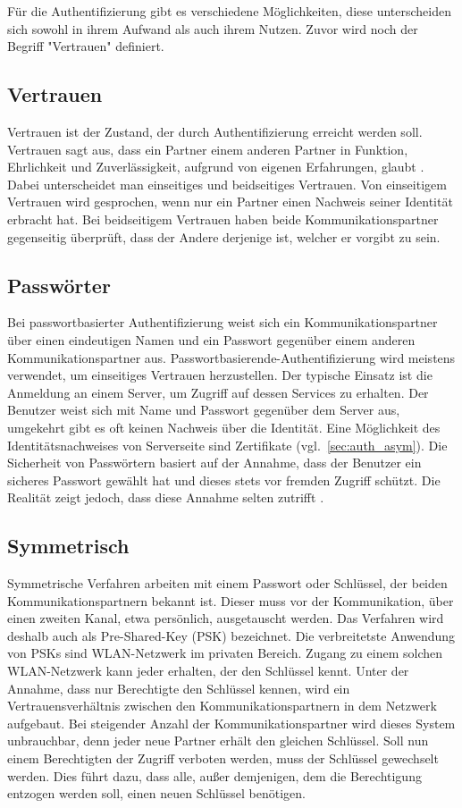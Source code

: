 \documentclass[11pt,a4paper]{report}
\begin{document}
Für die Authentifizierung gibt es verschiedene Möglichkeiten, diese unterscheiden sich sowohl in ihrem Aufwand als auch ihrem Nutzen. Zuvor wird noch der Begriff "Vertrauen" definiert.

\subsection{Vertrauen}

Vertrauen ist der Zustand, der durch Authentifizierung erreicht werden soll. Vertrauen sagt aus, dass ein Partner einem anderen Partner in Funktion, Ehrlichkeit und Zuverlässigkeit, aufgrund von eigenen Erfahrungen, glaubt \cite{chen}. Dabei unterscheidet man einseitiges und beidseitiges Vertrauen. Von einseitigem Vertrauen wird gesprochen, wenn nur ein Partner einen Nachweis seiner Identität erbracht hat. Bei beidseitigem Vertrauen haben beide Kommunikationspartner gegenseitig überprüft, dass der Andere derjenige ist, welcher er vorgibt zu sein.

\subsection{Passwörter}

Bei passwortbasierter Authentifizierung weist sich ein Kommunikationspartner über einen eindeutigen Namen und ein Passwort gegenüber einem anderen Kommunikationspartner aus. Passwortbasierende-Authentifizierung wird meistens verwendet, um einseitiges Vertrauen herzustellen. Der typische Einsatz ist die Anmeldung an einem Server, um Zugriff auf dessen Services zu erhalten. Der Benutzer weist sich mit Name und Passwort gegenüber dem Server aus, umgekehrt gibt es oft keinen Nachweis über die Identität. Eine Möglichkeit des Identitätsnachweises von Serverseite sind Zertifikate (vgl.~\ref{sec:auth_asym}). Die Sicherheit von Passwörtern basiert auf der Annahme, dass der Benutzer ein sicheres Passwort gewählt hat und dieses stets vor fremden Zugriff schützt. Die Realität zeigt jedoch, dass diese Annahme selten zutrifft \cite[s.~2]{gutmann}.

\subsection{Symmetrisch}

Symmetrische Verfahren arbeiten mit einem Passwort oder Schlüssel, der beiden Kommunikationspartnern bekannt ist. Dieser muss vor der Kommunikation, über einen zweiten Kanal, etwa persönlich, ausgetauscht werden. Das Verfahren wird deshalb auch als Pre-Shared-Key (PSK) bezeichnet. Die verbreitetste Anwendung von PSKs sind WLAN-Netzwerk im privaten Bereich. Zugang zu einem solchen WLAN-Netzwerk kann jeder erhalten, der den Schlüssel kennt. Unter der Annahme, dass nur Berechtigte den Schlüssel kennen, wird ein Vertrauensverhältnis zwischen den Kommunikationspartnern in dem Netzwerk aufgebaut. Bei steigender Anzahl der Kommunikationspartner wird dieses System unbrauchbar, denn jeder neue Partner erhält den gleichen Schlüssel. Soll nun einem Berechtigten der Zugriff verboten werden, muss der Schlüssel gewechselt werden. Dies führt dazu, dass alle, außer demjenigen, dem die Berechtigung entzogen werden soll, einen neuen Schlüssel benötigen.
\end{document}
